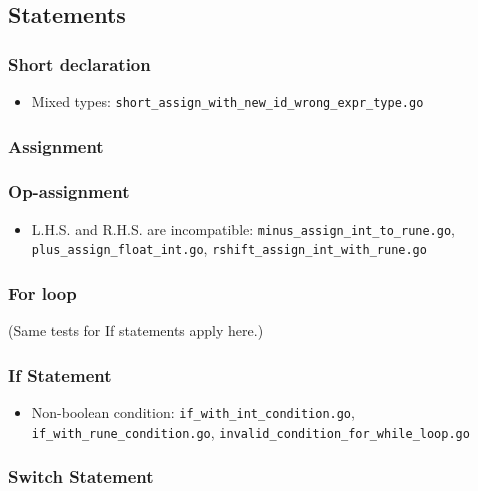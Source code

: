 \documentclass{article}
\begin{document}
\subsection*{Statements}

\subsubsection*{Short declaration}

\begin{itemize}
\item Mixed types: \texttt{short_assign_with_new_id_wrong_expr_type.go}
\end{itemize}

\subsubsection*{Assignment}
\subsubsection*{Op-assignment}

\begin{itemize}
\item L.H.S. and R.H.S. are incompatible: \texttt{minus_assign_int_to_rune.go}, \texttt{plus_assign_float_int.go}, \texttt{rshift_assign_int_with_rune.go}
\end{itemize}

\subsubsection*{For loop}

(Same tests for If statements apply here.)

\subsubsection*{If Statement}

\begin{itemize}
\item Non-boolean condition: \texttt{if_with_int_condition.go}, \texttt{if_with_rune_condition.go}, \texttt{invalid_condition_for_while_loop.go}
\end{itemize}

\subsubsection*{Switch Statement}
\end{document}
